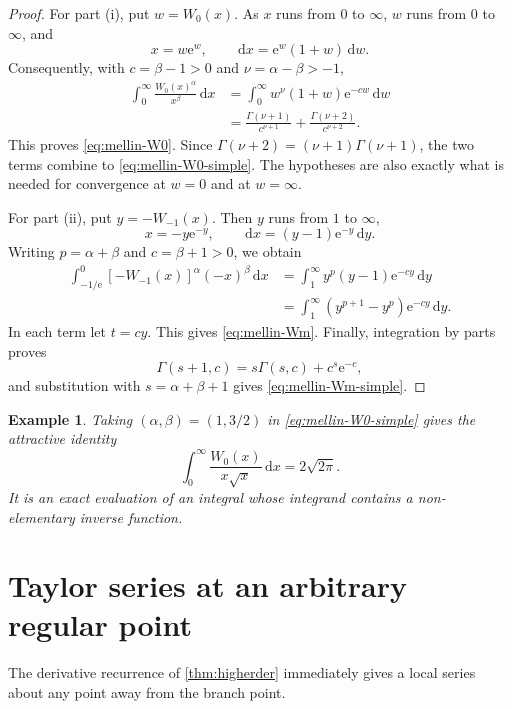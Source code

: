 \documentclass[11pt]{article}
\newtheorem{example}[theorem]{Example}
\theoremstyle{remark}
\newcommand{\Wz}{W_0}
\newcommand{\Wm}{W_{-1}}
\newcommand{\ee}{\mathrm e}
\newcommand{\dd}{\,\mathrm d}
\begin{document}
\begin{proof}
For part (i), put \(w=\Wz(x)\).  As \(x\) runs from \(0\) to
\(\infty\), \(w\) runs from \(0\) to \(\infty\), and
\[
 x=w\ee^w,\qquad \dd x=\ee^w(1+w)\dd w.
\]
Consequently, with \(c=\beta-1>0\) and
\(\nu=\alpha-\beta>-1\),
\begin{align*}
 \int_0^\infty \frac{\Wz(x)^\alpha}{x^\beta}\dd x
 &=\int_0^\infty w^\nu(1+w)\ee^{-cw}\dd w\\
 &=\frac{\Gamma(\nu+1)}{c^{\nu+1}}
   +\frac{\Gamma(\nu+2)}{c^{\nu+2}}.
\end{align*}
This proves \eqref{eq:mellin-W0}.  Since
\(\Gamma(\nu+2)=(\nu+1)\Gamma(\nu+1)\), the two terms combine to
\eqref{eq:mellin-W0-simple}.  The hypotheses are also exactly what is
needed for convergence at \(w=0\) and at \(w=\infty\).

For part (ii), put \(y=-\Wm(x)\).  Then \(y\) runs from \(1\) to
\(\infty\),
\[
       x=-y\ee^{-y},\qquad
       \dd x=(y-1)\ee^{-y}\dd y.
\]
Writing \(p=\alpha+\beta\) and \(c=\beta+1>0\), we obtain
\begin{align*}
 \int_{-1/\ee}^{0}[-\Wm(x)]^\alpha(-x)^\beta\dd x
 &=\int_1^\infty y^p(y-1)\ee^{-cy}\dd y\\
 &=\int_1^\infty
   \left(y^{p+1}-y^p\right)\ee^{-cy}\dd y.
\end{align*}
In each term let \(t=cy\).  This gives \eqref{eq:mellin-Wm}.
Finally, integration by parts proves
\[
       \Gamma(s+1,c)=s\Gamma(s,c)+c^s\ee^{-c},
\]
and substitution with \(s=\alpha+\beta+1\) gives
\eqref{eq:mellin-Wm-simple}.
\end{proof}

\begin{example}
Taking \((\alpha,\beta)=(1,3/2)\) in
\eqref{eq:mellin-W0-simple} gives the attractive identity
\begin{equation}\label{eq:classic-mellin-example}
       \int_0^\infty\frac{\Wz(x)}{x\sqrt{x}}\dd x
       =2\sqrt{2\pi}.
\end{equation}
It is an exact evaluation of an integral whose integrand contains a
non-elementary inverse function.
\end{example}

\section{Taylor series at an arbitrary regular point}\label{sec:localTaylor}

The derivative recurrence of \cref{thm:higherder} immediately gives a local
series about any point away from the branch point.
\end{document}
